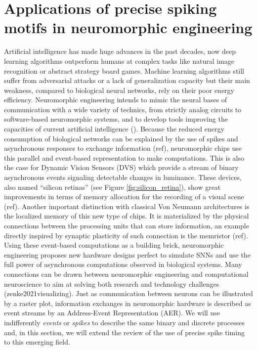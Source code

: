\documentclass[brainsci, %
               review,submit,pdftex,moreauthors
               ]{Definitions/mdpi}
\begin{document}
\section{Applications of precise spiking motifs in neuromorphic engineering}
\label{sec:neuromorphic}
Artificial intelligence has made huge advances in the past decades, now deep learning algorithms outperform humans at complex tasks like natural image recognition or abstract strategy board games. Machine learning algorithms still suffer from adversarial attacks or a lack of generalization capacity but their main weakness, compared to biological neural networks, rely on their poor energy efficiency. Neuromorphic engineering intends to mimic the neural bases of communication with a wide variety of technics, from strictly analog circuits to software-based neuromorphic systems, and to develop tools improving the capacities of current artificial intelligence (\cite{roy2018toward}). Because the reduced energy consumption of biological networks can be explained by the use of spikes and asynchronous responses to exchange information (ref), neuromorphic chips use this parallel and event-based representation to make computations. This is also the case for Dynamic Vision Sensors (DVS) which provide a stream of binary asynchronous events signaling detectable changes in luminance. These devices, also named ``silicon retinas'' (see Figure \ref{fig:silicon_retina}), show great improvements in terms of memory allocation for the recording of a visual scene (ref). Another important distinction with classical Von Neumann architectures is the localized memory of this new type of chips. It is materialized by the physical connections between the processing units that can store information, an example directly inspired by synaptic plasticity of such connection is the memristor (ref). Using these event-based computations as a building brick, neuromorphic engineering proposes new hardware designs perfect to simulate SNNs and use the full power of asynchronous computations observed in biological systems. Many connections can be drawn between neuromorphic engineering and computational neuroscience to aim at solving both research and technology challenges (zenke2021visualizing). Just as communication between neurons can be illustrated by a raster plot, information exchanges in neuromorphic hardware is described as event streams by an Address-Event Representation (AER). We will use indifferently \textit{events} or \textit{spikes} to describe the same binary and discrete processes and, in this section, we will extend the review of the use of precise spike timing to this emerging field. 
\end{document}
